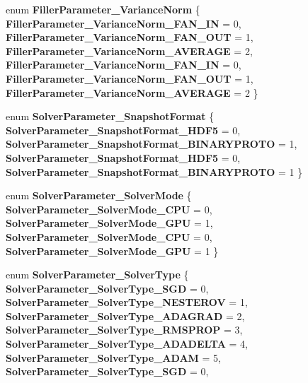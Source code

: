 \begin{DoxyCompactItemize}
enum {\bfseries Filler\+Parameter\+\_\+\+Variance\+Norm} \{ \newline
{\bfseries Filler\+Parameter\+\_\+\+Variance\+Norm\+\_\+\+F\+A\+N\+\_\+\+IN} = 0, 
{\bfseries Filler\+Parameter\+\_\+\+Variance\+Norm\+\_\+\+F\+A\+N\+\_\+\+O\+UT} = 1, 
{\bfseries Filler\+Parameter\+\_\+\+Variance\+Norm\+\_\+\+A\+V\+E\+R\+A\+GE} = 2, 
{\bfseries Filler\+Parameter\+\_\+\+Variance\+Norm\+\_\+\+F\+A\+N\+\_\+\+IN} = 0, 
\newline
{\bfseries Filler\+Parameter\+\_\+\+Variance\+Norm\+\_\+\+F\+A\+N\+\_\+\+O\+UT} = 1, 
{\bfseries Filler\+Parameter\+\_\+\+Variance\+Norm\+\_\+\+A\+V\+E\+R\+A\+GE} = 2
 \}
\item 
\mbox{\label{namespacecaffe_a30b44a3e0a56c25111220d17a63ea6af}} 
enum {\bfseries Solver\+Parameter\+\_\+\+Snapshot\+Format} \{ {\bfseries Solver\+Parameter\+\_\+\+Snapshot\+Format\+\_\+\+H\+D\+F5} = 0, 
{\bfseries Solver\+Parameter\+\_\+\+Snapshot\+Format\+\_\+\+B\+I\+N\+A\+R\+Y\+P\+R\+O\+TO} = 1, 
{\bfseries Solver\+Parameter\+\_\+\+Snapshot\+Format\+\_\+\+H\+D\+F5} = 0, 
{\bfseries Solver\+Parameter\+\_\+\+Snapshot\+Format\+\_\+\+B\+I\+N\+A\+R\+Y\+P\+R\+O\+TO} = 1
 \}
\item 
\mbox{\label{namespacecaffe_aab2b9b950b8d19c2e2a5f2946bbef217}} 
enum {\bfseries Solver\+Parameter\+\_\+\+Solver\+Mode} \{ {\bfseries Solver\+Parameter\+\_\+\+Solver\+Mode\+\_\+\+C\+PU} = 0, 
{\bfseries Solver\+Parameter\+\_\+\+Solver\+Mode\+\_\+\+G\+PU} = 1, 
{\bfseries Solver\+Parameter\+\_\+\+Solver\+Mode\+\_\+\+C\+PU} = 0, 
{\bfseries Solver\+Parameter\+\_\+\+Solver\+Mode\+\_\+\+G\+PU} = 1
 \}
\item 
\mbox{\label{namespacecaffe_a1c9a20639a0fac18e4f65772b5345f01}} 
enum {\bfseries Solver\+Parameter\+\_\+\+Solver\+Type} \{ \newline
{\bfseries Solver\+Parameter\+\_\+\+Solver\+Type\+\_\+\+S\+GD} = 0, 
{\bfseries Solver\+Parameter\+\_\+\+Solver\+Type\+\_\+\+N\+E\+S\+T\+E\+R\+OV} = 1, 
{\bfseries Solver\+Parameter\+\_\+\+Solver\+Type\+\_\+\+A\+D\+A\+G\+R\+AD} = 2, 
{\bfseries Solver\+Parameter\+\_\+\+Solver\+Type\+\_\+\+R\+M\+S\+P\+R\+OP} = 3, 
\newline
{\bfseries Solver\+Parameter\+\_\+\+Solver\+Type\+\_\+\+A\+D\+A\+D\+E\+L\+TA} = 4, 
{\bfseries Solver\+Parameter\+\_\+\+Solver\+Type\+\_\+\+A\+D\+AM} = 5, 
{\bfseries Solver\+Parameter\+\_\+\+Solver\+Type\+\_\+\+S\+GD} = 0, 

\end{DoxyCompactItemize}
